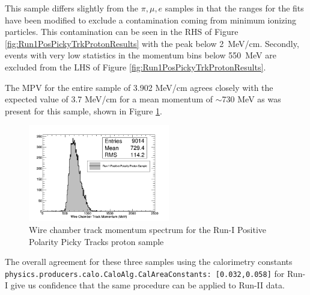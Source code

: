 This sample differs slightly from the $\pi, \mu, e$ samples in that the ranges for the fits have been modified to exclude a contamination coming from minimum ionizing particles. This contamination can be seen in the RHS of Figure \ref{fig:Run1PosPickyTrkProtonResults} with the peak below 2~MeV/cm. Secondly, events with very low statistics in the momentum bins below 550~MeV are excluded from the LHS of Figure \ref{fig:Run1PosPickyTrkProtonResults}.

The MPV for the entire sample of 3.902 MeV/cm agrees closely with the expected value of 3.7 MeV/cm for a mean momentum of $\sim$730 MeV as was present for this sample, shown in Figure \ref{fig:Run1PosPickyTrkProtonMomentumSpec}.

\begin{figure}[htb]
\centering
\includegraphics[width=0.55\textwidth]{images/WCTrkMomentumRun1PosProton.png}
\caption{Wire chamber track momentum spectrum for the Run-I Positive Polarity Picky Tracks proton sample  }
\label{fig:Run1PosPickyTrkProtonMomentumSpec}
\end{figure}

The overall agreement for these three samples using the calorimetry constants \verb!physics.producers.calo.CaloAlg.CalAreaConstants: [0.032,0.058]! for Run-I  give us confidence that the same procedure can be applied to Run-II data.

